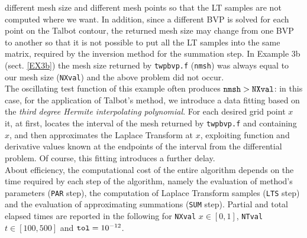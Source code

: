 \documentclass[a4paper,10pt]{report}%
\begin{document}
different mesh size and different mesh points so that the LT samples are not computed where we want.
In addition, since a different BVP is solved for each point on the Talbot contour, the returned mesh size may
change from one BVP to another so that it is not possible to put all the LT samples into the same matrix,
required by the inversion method for the summation step.
In Example 3b (sect. \ref{EX3b}) the mesh size returned by {\tt twpbvp.f} ({\tt nmsh}) was always equal to our
mesh size ({\tt NXval}) and the above problem did not occur.
\\
The oscillating test function of this example often produces ${\tt nmsh}>{\tt NXval}$: in this case, for
the application of Talbot's method, we introduce a data fitting based on the {\em third degree Hermite
interpolating polynomial}. For each desired grid point $x$ it, at first, locates the interval of the
mesh returned by {\tt twpbvp.f} and containing $x$, and then approximates the Laplace Transform at $x$,
exploiting function and derivative values known at the endpoints of the interval from the differential problem. 
Of course, this fitting introduces a further delay.
\\[.15in]
\indent About efficiency, the computational cost of the entire algorithm depends on the time required by each step of
the algorithm, namely the evaluation of method's parameters ({\tt PAR} step), the computation of Laplace
Transform samples ({\tt LTS} step) and the evaluation of approximating summations ({\tt SUM} step).
Partial and total elapsed times are reported in the following for {\tt NXval} $x\in[0,1]$, {\tt NTval}
$t\in[100,500]$ and ${\tt tol}=10^{-12}$.
\end{document}
